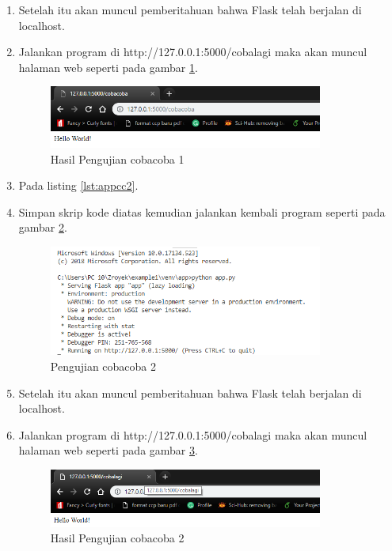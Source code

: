 \begin{enumerate}
\item Setelah itu akan muncul pemberitahuan bahwa Flask telah berjalan di localhost.
\item Jalankan program di http://127.0.0.1:5000/cobalagi maka akan muncul halaman web seperti pada gambar \ref{fig:hujicc1}.
\begin{figure}[!htbp]
	\centerline{\includegraphics[width=0.85\textwidth]{figures/9/hujicc1.PNG}}
	\caption{Hasil Pengujian cobacoba 1}
	\label{fig:hujicc1}
\end{figure}

\item Pada listing \ref{lst:appcc2}.


\item Simpan skrip kode diatas kemudian jalankan kembali program seperti pada gambar \ref{fig:ujicc2}.
\begin{figure}[!htbp]
	\centerline{\includegraphics[width=0.85\textwidth]{figures/9/ujicc2.PNG}}
	\caption{Pengujian cobacoba 2}
	\label{fig:ujicc2}
\end{figure}

\item Setelah itu akan muncul pemberitahuan bahwa Flask telah berjalan di localhost.
\item Jalankan program di http://127.0.0.1:5000/cobalagi maka akan muncul halaman web seperti pada gambar \ref{fig:hujicc2}.
\begin{figure}[!htbp]
	\centerline{\includegraphics[width=0.85\textwidth]{figures/9/hujicc2.PNG}}
	\caption{Hasil Pengujian cobacoba 2}
	\label{fig:hujicc2}
\end{figure}


\end{enumerate}
